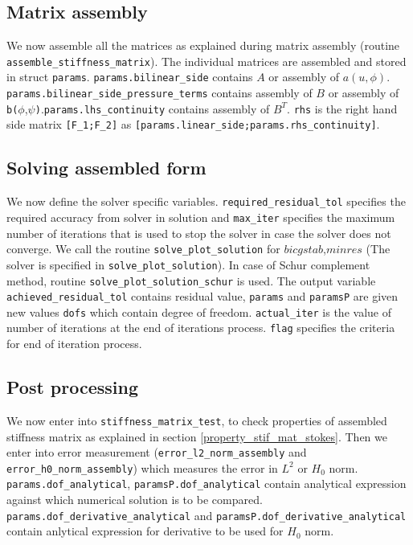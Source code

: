 \documentclass[a4paper,openany]{book}
\begin{document}
\subsection{Matrix assembly}

We now assemble all the matrices as explained during matrix assembly (routine \verb|assemble_stiffness_matrix|). The individual matrices are assembled and stored in struct \verb|params|. \verb|params.bilinear_side| contains $A$ or assembly of $a(u,\phi)$. \verb|params.bilinear_side_pressure_terms| contains assembly of $B$ or assembly of \verb|b(|$\phi$,$\psi$\verb|)|.\verb|params.lhs_continuity| contains assembly of $B^T$. \verb|rhs| is the right hand side matrix \verb|[F_1;F_2]| as \verb|[params.linear_side;params.rhs_continuity]|. \\

\subsection{Solving assembled form}

We now define the solver specific variables. \verb|required_residual_tol| specifies the required accuracy from solver in solution and \verb|max_iter| specifies the maximum number of iterations that is used to stop the solver in case the solver does not converge. We call the routine \verb|solve_plot_solution| for $bicgstab$,$minres$ (The solver is specified in \verb|solve_plot_solution|). In case of Schur complement method, routine \verb|solve_plot_solution_schur| is used. The output variable \verb|achieved_residual_tol| contains residual value, \verb|params| and \verb|paramsP| are given new values \verb|dofs| which contain degree of freedom. \verb|actual_iter| is the value of number of iterations at the end of iterations process. \verb|flag| specifies the criteria for end of iteration process.\\

\subsection{Post processing}

We now enter into \verb|stiffness_matrix_test|, to check properties of assembled stiffness matrix as explained in section \ref{property_stif_mat_stokes}. Then we enter into error measurement (\verb|error_l2_norm_assembly| and \verb|error_h0_norm_assembly|) which measures the error in $L^2$ or $H_0$ norm. \verb|params.dof_analytical|, \verb|paramsP.dof_analytical| contain analytical expression against which numerical solution is to be compared. \verb|params.dof_derivative_analytical| and \verb|paramsP.dof_derivative_analytical| contain anlytical expression for derivative to be used for $H_0$ norm.\\
\end{document}
